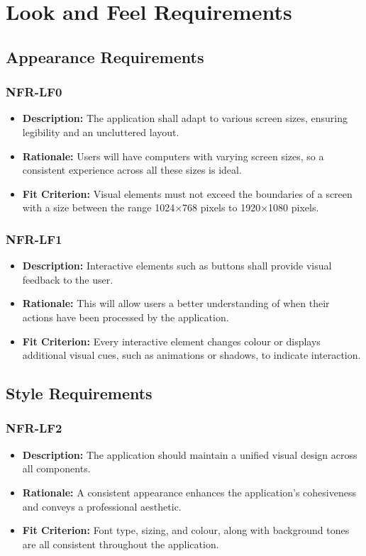 \documentclass[12pt]{article}
\begin{document}
\normalsize

\section{Look and Feel Requirements}
\subsection{Appearance Requirements}
\subsubsection*{NFR-LF0}
\label{sec:LF0}
\begin{itemize}
  \item \textbf{Description:} The application shall adapt to various screen sizes, ensuring legibility and an uncluttered layout.
  \item \textbf{Rationale:} Users will have computers with varying screen sizes, so a consistent experience across all these sizes is ideal.
  \item \textbf{Fit Criterion:} Visual elements must not exceed the boundaries of a screen with a size between the range 1024×768 pixels to 1920×1080 pixels.
\end{itemize}
\subsubsection*{NFR-LF1}
\label{sec:LF1}
\begin{itemize}
  \item \textbf{Description:} Interactive elements such as buttons shall provide visual feedback to the user.
  \item \textbf{Rationale:} This will allow users a better understanding of when their actions have been processed by the application.
  \item \textbf{Fit Criterion:} Every interactive element changes colour or displays additional visual cues, such as animations or shadows, to indicate interaction.
\end{itemize}
\subsection{Style Requirements}
\subsubsection*{NFR-LF2}
\label{sec:LF2}
\begin{itemize}
  \item \textbf{Description:} The application should maintain a unified visual design across all components.
  \item \textbf{Rationale:} A consistent appearance enhances the application's cohesiveness and conveys a professional aesthetic.
  \item \textbf{Fit Criterion:} Font type, sizing, and colour, along with background tones are all consistent throughout the application.
\end{itemize}
\end{document}
